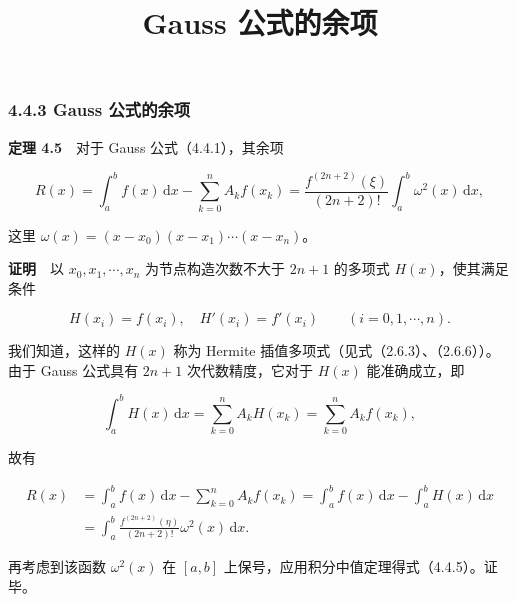 \documentclass[
  10pt,
  fontset=fandol]{ctexart}
\title{Gauss 公式的余项}
\author{}
\date{}
\begin{document}
\maketitle

\subsubsection{4.4.3 Gauss 公式的余项}\label{gauss-ux516cux5f0fux7684ux4f59ux9879}

\textbf{定理 4.5}　对于 Gauss 公式（4.4.1），其余项

\[
R(x)=\int_a^b f(x)\,\mathrm{d}x-\sum_{k=0}^{n}A_kf(x_k)
=\frac{f^{(2n+2)}(\xi)}{(2n+2)!}\int_a^b\omega^2(x)\,\mathrm{d}x,
\tag{4.4.5}
\]

这里 \(\omega(x)=(x-x_0)(x-x_1)\cdots(x-x_n)\)。

\textbf{证明}　以 \(x_0,x_1,\cdots,x_n\) 为节点构造次数不大于 \(2n+1\) 的多项式 \(H(x)\)，使其满足条件

\[
H(x_i)=f(x_i),\quad H'(x_i)=f'(x_i)\qquad(i=0,1,\cdots,n).
\]

我们知道，这样的 \(H(x)\) 称为 Hermite 插值多项式（见式（2.6.3）、（2.6.6））。由于 Gauss 公式具有 \(2n+1\) 次代数精度，它对于 \(H(x)\) 能准确成立，即

\[
\int_a^b H(x)\,\mathrm{d}x
=\sum_{k=0}^{n}A_kH(x_k)=\sum_{k=0}^{n}A_kf(x_k),
\]

故有

\[
\begin{aligned}
R(x)&=\int_a^b f(x)\,\mathrm{d}x-\sum_{k=0}^{n}A_kf(x_k)
=\int_a^b f(x)\,\mathrm{d}x-\int_a^b H(x)\,\mathrm{d}x\\
&=\int_a^b\frac{f^{(2n+2)}(\eta)}{(2n+2)!}\omega^2(x)\,\mathrm{d}x.
\end{aligned}
\]

再考虑到该函数 \(\omega^2(x)\) 在 \([a,b]\) 上保号，应用积分中值定理得式（4.4.5）。证毕。
\end{document}
